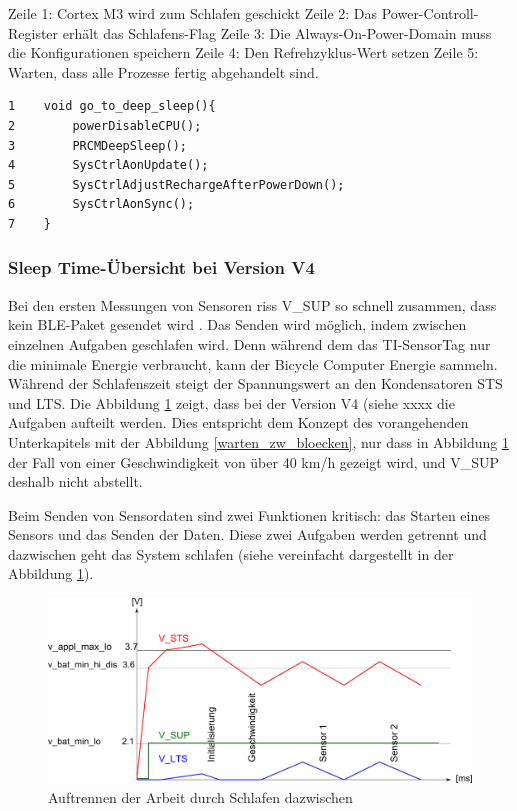 Zeile 1:\hspace{1cm}   Cortex M3 wird zum Schlafen geschickt
Zeile 2:\hspace{1cm}   Das Power-Controll-Register erhält das Schlafens-Flag
Zeile 3:\hspace{1cm}   Die Always-On-Power-Domain muss die Konfigurationen speichern
Zeile 4:\hspace{1cm}   Den Refrehzyklus-Wert setzen
Zeile 5:\hspace{1cm}   Warten, dass alle Prozesse fertig abgehandelt sind.

\begin{minipage}[t]{1\textwidth}
\small\begin{verbatim}
1    void go_to_deep_sleep(){ 
2        powerDisableCPU();
3        PRCMDeepSleep();
4        SysCtrlAonUpdate();
5        SysCtrlAdjustRechargeAfterPowerDown();
6        SysCtrlAonSync();
7    }
\end{verbatim}\normalsize
\end{minipage}

\subsubsection{Sleep Time-Übersicht bei Version V4}
	    
Bei den ersten Messungen von Sensoren riss V\_SUP so schnell zusammen, dass kein BLE-Paket gesendet wird . Das Senden wird möglich, indem zwischen einzelnen Aufgaben geschlafen wird. Denn während dem das TI-SensorTag nur die minimale Energie verbraucht, kann der Bicycle Computer Energie sammeln. Während der Schlafenszeit steigt der Spannungswert an den Kondensatoren STS und LTS. Die Abbildung \ref{schnarch} zeigt, dass bei der Version V4 (siehe xxxx  die Aufgaben aufteilt werden. Dies entspricht dem Konzept des vorangehenden Unterkapitels mit der Abbildung \ref{warten_zw_bloecken}, nur dass in Abbildung \ref{schnarch} der Fall von einer Geschwindigkeit von über 40 km/h  gezeigt wird, und V\_SUP deshalb nicht abstellt.   

Beim Senden von Sensordaten sind zwei Funktionen kritisch: das Starten eines Sensors und das Senden der Daten. Diese zwei Aufgaben werden getrennt und dazwischen geht das System schlafen (siehe vereinfacht dargestellt in der Abbildung \ref{schnarch}).

\begin{figure}[ht]
  \includegraphics[width=1.0\textwidth]{3Vorgehen/imag/HIGH_ENERGY.png}
  \caption{Auftrennen der Arbeit durch Schlafen dazwischen}
  \label{schnarch}
\end{figure}


